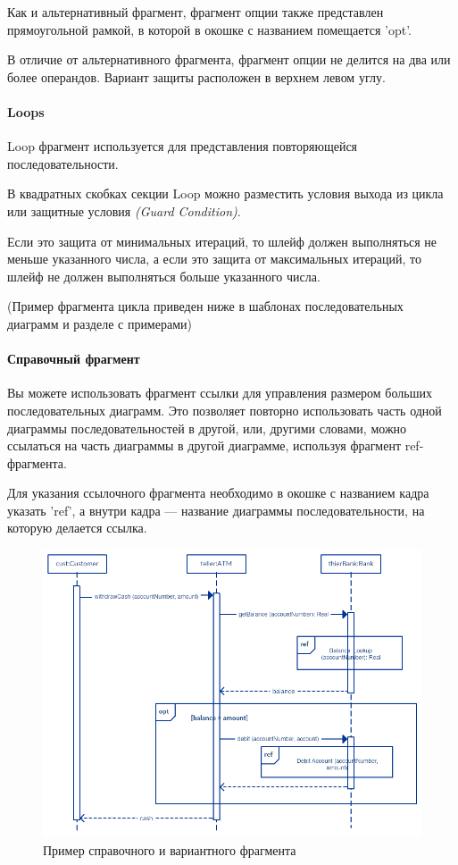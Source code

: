 \documentclass[a4paper,12pt]{report}
\begin{document}
Как и альтернативный фрагмент, фрагмент опции также представлен прямоугольной рамкой, в которой в окошке с названием помещается 'opt'.

В отличие от альтернативного фрагмента, фрагмент опции не делится на два или более операндов. Вариант защиты расположен в верхнем левом углу.

\paragraph{Loops}

Loop фрагмент используется для представления повторяющейся последовательности.

В квадратных скобках секции Loop можно разместить условия выхода из цикла или защитные условия \textit{(Guard Condition)}. 

Если это защита от минимальных итераций, то шлейф должен выполняться не меньше указанного числа, а если это защита от максимальных итераций, то шлейф не должен выполняться больше указанного числа.

(Пример фрагмента цикла приведен ниже в шаблонах последовательных диаграмм и разделе с примерами)

\paragraph{Справочный фрагмент}

Вы можете использовать фрагмент ссылки для управления размером больших последовательных диаграмм. Это позволяет повторно использовать часть одной диаграммы последовательностей в другой, или, другими словами, можно ссылаться на часть диаграммы в другой диаграмме, используя фрагмент ref-фрагмента.

Для указания ссылочного фрагмента необходимо в окошке с названием кадра указать 'ref', а внутри кадра --- название диаграммы последовательности, на которую делается ссылка.

\begin{figure}[h!]
	\centering
	\includegraphics[width=0.6\linewidth]{images/frameoptref}
	\caption{Пример справочного и вариантного фрагмента}
	\label{fig:frameoptref}
\end{figure}
\end{document}
